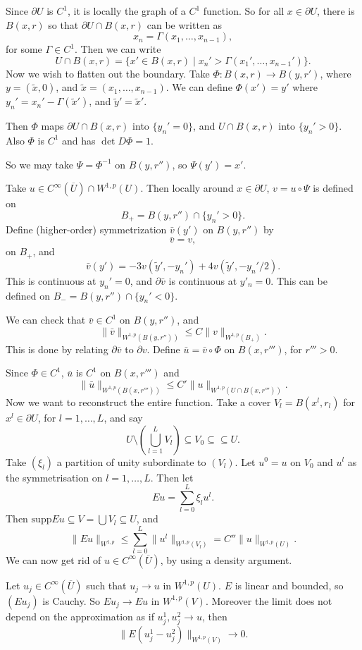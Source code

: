 \documentclass[12pt]{article}
\begin{document}
\begin{proofbox}
	Since $\partial U$ is $C^1$, it is locally the graph of a $C^1$ function. So for all $x \in \partial U$, there is $B(x, r)$ so that $\partial U \cap B(x, r)$ can be written as
	\[
	x_n = \Gamma(x_1, \ldots, x_{n-1}),
	\]
	for some $\Gamma \in C^1$. Then we can write
	\[
		U \cap B(x, r) = \{x' \in B(x, r) \mid x_n' > \Gamma(x_1', \ldots, x_{n-1}')\}.
	\]
	Now we wish to flatten out the boundary. Take $\Phi : B(x, r) \to B(y, r')$, where $y = (\tilde x, 0)$, and $\tilde x = (x_1, \ldots, x_{n-1})$. We can define $\Phi(x') = y'$ where $y_n' = x_n' - \Gamma(\tilde x')$, and $\tilde y' = \tilde x'$.

	Then $\Phi$ maps $\partial U \cap B(x, r)$ into $\{y_n' = 0\}$, and $U \cap B(x, r)$ into $\{y_n' > 0\}$. Also $\Phi$ is $C^1$ and has $\det D \Phi = 1$.

	So we may take $\Psi = \Phi^{-1}$ on $B(y, r'')$, so $\Psi(y') = x'$.

	Take $u \in C^{\infty}(\overline{U}) \cap W^{1, p}(U)$. Then locally around $x \in \partial U$, $v = u \circ \Psi$ is defined on
	\[
		B_+ = B(y, r'') \cap \{y_n' > 0\}.
	\]
	Define (higher-order) symmetrization $\bar v(y')$ on $B(y, r'')$ by
	\[
	\bar v = v,
	\]
	on $B_+$, and
	\[
	\bar v(y') = - 3 v(\tilde y', -y_n') + 4 v(\tilde y', - y_n'/2).
	\]
	This is continuous at $y_n' = 0$, and $\partial \bar v$ is continuous at $y'_n = 0$. This can be defined on $B_- = B(y, r'') \cap \{y_n' < 0\}$.

	We can check that $\bar v \in C^{1}$ on $B(y, r'')$, and
	\[
	\|\bar v\|_{W^{1, p}(B(y, r''))} \leq C \|v\|_{W^{1, p}(B_+)}.
	\]
	This is done by relating $\partial \bar v$ to $\partial v$. Define $\bar u = \bar v \circ \Phi$ on $B(x, r''')$, for $r''' > 0$.

	Since $\Phi \in C^1$, $\bar u$ is $C^1$ on $B(x, r''')$ and
	\[
	\|\bar u\|_{W^{1, p}(B(x, r'''))} \leq C' \|u\|_{W^{1,p}(U \cap B(x, r'''))}.
	\]
	Now we want to reconstruct the entire function. Take a cover $V_l = B(x^l, r_l)$ for $x^l \in \partial U$, for $l = 1, \ldots, L$, and say
	\[
	U \setminus \left( \bigcup_{l= 1}^L V_l \right) \subseteq V_0 \subseteq \subseteq U.
	\]
	Take $(\xi_l)$ a partition of unity subordinate to $(V_l)$. Let $u^0 = u$ on $V_0$ and $u^l$ as the symmetrisation on $l = 1, \ldots, L$. Then let
	\[
	Eu = \sum_{l = 0}^{L} \xi_l u^{l}.
	\]
	Then $\mathrm{supp} Eu \subseteq V = \bigcup V_l \subseteq U$, and
	\[
	\|Eu\|_{W^{1,p}} \leq \sum_{l = 0}^L \|u^l\|_{W^{1,p}(V_l)} = C'' \|u\|_{W^{1,p}(U)}.
	\]
	We can now get rid of $u \in C^{\infty}(\overline{U})$, by using a density argument.

	Let $u_j \in C^{\infty}(\overline{U})$ such that $u_j \to u$ in $W^{1, p}(U)$. $E$ is linear and bounded, so $(E u_j)$ is Cauchy. So $E u_j \to Eu$ in $W^{1, p}(V)$. Moreover the limit does not depend on the approximation as if $u_j^1, u_j^2 \to u$, then
	\[
	\|E(u_j^1 - u_j^2)\|_{W^{1, p}(V)} \to 0.
	\]
\end{proofbox}
\end{document}
